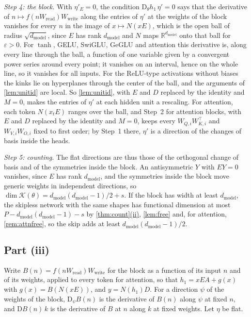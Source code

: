 \documentclass[10pt]{article}
\theoremstyle{definition}
\theoremstyle{remark}
\newcommand{\R}{\mathbb{R}}
\newcommand{\Wread}{W_{\mathrm{read}}}
\newcommand{\Wwrite}{W_{\mathrm{write}}}
\newcommand{\dm}{d_{\mathrm{model}}}
\newcommand{\Der}{\mathrm{D}}
\DeclareRobustCommand{\cpref}[2]{\hyperref[#1:#2]{\cref*{#1}(#2)}}
\begin{document}
\emph{Step 4: the block.} With $\eta'_E = 0$, the condition $\Der_\theta h_1\,\eta' = 0$ says that the derivative of $n \mapsto f(n\Wread)\Wwrite$ along the entries of $\eta'$ at the weights of the block vanishes for every $n$ in the image of $x \mapsto N(xE)$, which is the open ball of radius $\sqrt{\dm}$, since $E$ has rank $\dm$ and $N$ maps $\R^{\dm}$ onto that ball for $\varepsilon > 0$. For $\tanh$, GELU, SwiGLU, GeGLU and attention this derivative is, along every line through the ball, a function of one variable given by a convergent power series around every point; it vanishes on an interval, hence on the whole line, so it vanishes for all inputs. For the ReLU-type activations without biases the kinks lie on hyperplanes through the center of the ball, and the arguments of \cref{lem:unitid} are local. So \cref{lem:unitid}, with $E$ and $D$ replaced by the identity and $M = 0$, makes the entries of $\eta'$ at each hidden unit a rescaling. For attention, each token $N(x_tE)$ ranges over the ball, and Step~2 for attention blocks, with $E$ and $D$ replaced by the identity and $M = 0$, keeps every $W_{Q,i}W_{K,i}^\top$ and $W_{V,i}W_{O,i}$ fixed to first order; by Step~1 there, $\eta'$ is a direction of the changes of basis inside the heads.

\emph{Step 5: counting.} The flat directions are thus those of the orthogonal change of basis and of the symmetries inside the block. An antisymmetric $Y$ with $EY = 0$ vanishes, since $E$ has rank $\dm$, and the symmetries inside the block move generic weights in independent directions, so $\dim\mathcal K(\theta) = \dm(\dm-1)/2 + s$. If the block has width at least $\dm$, the skipless network with the same shapes has functional dimension at most $P - \dm(\dm-1) - s$ by \cpref{thm:count}{ii}, \cref{lem:free} and, for attention, \cref{rem:attnfree}, so the skip adds at least $\dm(\dm-1)/2$.

\subsection*{Part (iii)}

Write $B(n) = f(n\Wread)\Wwrite$ for the block as a function of its input $n$ and of its weights, applied to every token for attention, so that $h_1 = xEA + g(x)$ with $g(x) = B(N(xE))$, and $y = N(h_1)D$. For a direction $\psi$ of the weights of the block, $\Der_\psi B(n)$ is the derivative of $B(n)$ along $\psi$ at fixed $n$, and $\Der B(n)\,k$ is the derivative of $B$ at $n$ along $k$ at fixed weights. Let $\eta$ be flat.
\end{document}
